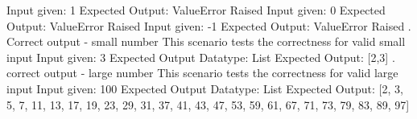 \documentclass[]{article}
\begin{document}
Input given: 1
    \hfil \newline
Expected Output: ValueError Raised
    \hfil \newline
Input given: 0
    \hfil \newline
 Expected Output: ValueError Raised
    \hfil \newline
Input given: -1
    \hfil \newline
Expected Output: ValueError Raised
\hfil {}. Correct output - small number
\hfil \newline
 This scenario tests the correctness for valid small input
    \hfil \newline
Input given: 3
    \hfil \newline
Expected Output Datatype: List
    \hfil \newline
Expected Output: [2,3]
\hfil {}. correct output - large number
\hfil \newline
This scenario tests the correctness for valid large input
\hfil \newline
Input given: 100
    \hfil \newline
Expected Output Datatype: List
    \hfil \newline
Expected Output: [2, 3, 5, 7, 11, 13, 17, 19, 23, 29, 31, 37, 41, 43, 47, 53, 59, 61, 67, 71, 73, 79, 83, 89, 97]
\end{document}
